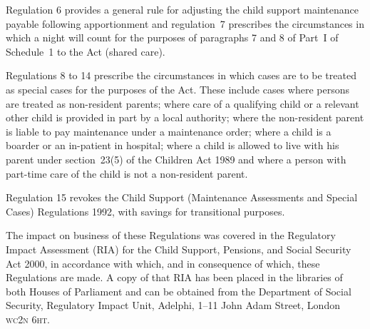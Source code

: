 \documentclass[12pt,a4paper]{article}
\begin{document}
Regulation 6 provides a general rule for adjusting the child support maintenance payable following apportionment and regulation~7 prescribes the circumstances in which a night will count for the purposes of paragraphs 7 and 8 of Part~I of Schedule~1 to the Act (shared care).

Regulations 8 to 14 prescribe the circumstances in which cases are to be treated as special cases for the purposes of the Act. These include cases where persons are treated as non-resident parents; where care of a qualifying child or a relevant other child is provided in part by a local authority; where the non-resident parent is liable to pay maintenance under a maintenance order; where a child is a boarder or an in-patient in hospital; where a child is allowed to live with his parent under section~23(5) of the Children Act 1989 and where a person with part-time care of the child is not a non-resident parent.

Regulation 15 revokes the Child Support (Maintenance Assessments and Special Cases) Regulations 1992, with savings for transitional purposes.

The impact on business of these Regulations was covered in the Regulatory Impact Assessment (RIA) for the Child Support, Pensions, and Social Security Act 2000, in accordance with which, and in consequence of which, these Regulations are made. A copy of that RIA has been placed in the libraries of both Houses of Parliament and can be obtained from the Department of Social Security, Regulatory Impact Unit, Adelphi, 1--11 John Adam Street, London \textsc{\lowercase{WC2N 6HT}}. 
\end{document}
